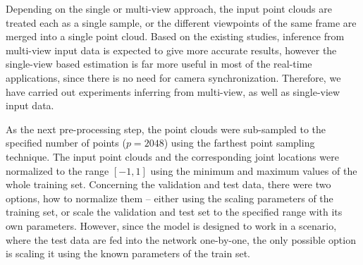 



Depending on the single or multi-view approach, the input point clouds are treated each as a single sample, or the different viewpoints of the same frame are merged into a single point cloud. Based on the existing studies, inference from multi-view input data is expected to give more accurate results, however the single-view based estimation is far more useful in most of the real-time applications, since there is no need for camera synchronization. Therefore, we have carried out experiments inferring from multi-view, as well as single-view input data.\par%
\par
\vspace{5mm}
\noindent
As the next pre-processing step, the point clouds were sub-sampled to the specified number of points ($p = 2048$) using the farthest point sampling technique. The input point clouds and the corresponding joint locations were normalized to the range $ [-1, 1]$ using the minimum and maximum values of the whole training set. Concerning the validation and test data, there were two options, how to normalize them – either using the scaling parameters of the training set, or scale the validation and test set to the specified range with its own parameters. However, since the model is designed to work in a scenario, where the test data are fed into the network one-by-one, the only possible option is scaling it using the known parameters of the train set.\par


